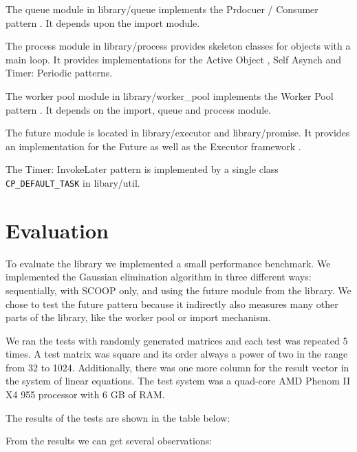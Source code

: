 \documentclass[a4paper,10pt]{article}
\newcommand{\dir} [1] [] {#1}
\newcommand{\todoref}{\todo{ref}}
\begin{document}
The queue module in \dir{library/queue} implements the Prdocuer / Consumer pattern \todoref.
It depends upon the import module.

The process module in \dir{library/process} provides skeleton classes for objects with a main loop.
It provides implementations for the Active Object \todoref, Self Asynch \todoref and Timer: Periodic \todoref patterns.

The worker pool module in \dir{library/worker\_pool} implements the Worker Pool pattern \todoref.
It depends on the import, queue and process module.

The future module is located in \dir{library/executor} and \dir{library/promise}.
It provides an implementation for the Future \todoref as well as the Executor framework \todoref.

The Timer: InvokeLater pattern \todoref is implemented by a single class \lstinline!CP_DEFAULT_TASK! in \dir{libary/util}.





\section{Evaluation}
\label {sec:evaluation}

To evaluate the library we implemented a small performance benchmark.
We implemented the Gaussian elimination algorithm \todoref in three different ways: sequentially, with SCOOP only, and using the future module \todoref from the library.
We chose to test the future pattern because it indirectly also measures many other parts of the library, like the worker pool or import mechanism.

We ran the tests with randomly generated matrices and each test was repeated 5 times.
A test matrix was square and its order always a power of two in the range from 32 to 1024.
Additionally, there was one more column for the result vector in the system of linear equations.
The test system was a quad-core AMD Phenom II X4 955 processor with 6 GB of RAM.

The results of the tests are shown in the table below:


From the results we can get several observations:
\end{document}
